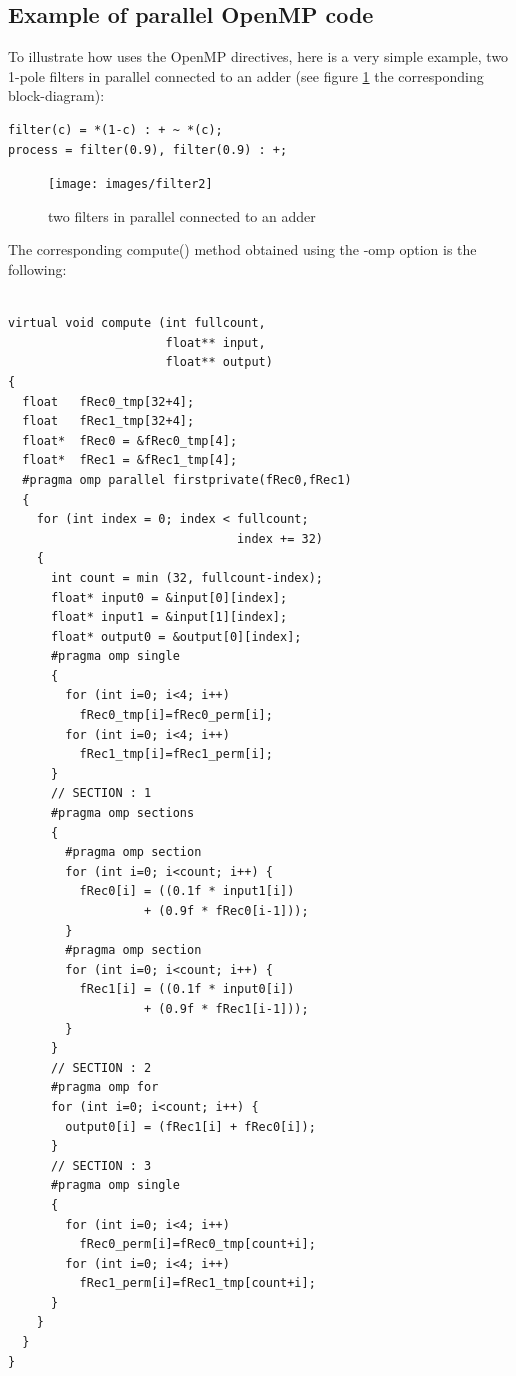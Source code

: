 \documentclass[a4paper,10pt]{book}
\begin{document}
\subsection{Example of parallel OpenMP code}
To illustrate how \faust uses the OpenMP directives, here is a very simple example, two 1-pole filters in parallel connected to an adder (see figure \ref{fig:parfilter} the corresponding block-diagram):

\begin{lstlisting}
filter(c) = *(1-c) : + ~ *(c);
process = filter(0.9), filter(0.9) : +; 
\end{lstlisting}

\begin{figure}[htb] 
  \centering
  \texttt{[image: images/filter2]}
  \caption{two filters in parallel connected to an adder}   
  \label{fig:parfilter}
\end{figure}

The corresponding compute() method obtained using the -omp option is the following:
\begin{lstlisting}

virtual void compute (int fullcount, 
                      float** input, 
                      float** output) 
{
  float   fRec0_tmp[32+4];
  float   fRec1_tmp[32+4];
  float*  fRec0 = &fRec0_tmp[4];
  float*  fRec1 = &fRec1_tmp[4];
  #pragma omp parallel firstprivate(fRec0,fRec1)
  {
    for (int index = 0; index < fullcount; 
                                index += 32) 
    {
      int count = min (32, fullcount-index);
      float* input0 = &input[0][index];
      float* input1 = &input[1][index];
      float* output0 = &output[0][index];
      #pragma omp single
      {
        for (int i=0; i<4; i++) 
          fRec0_tmp[i]=fRec0_perm[i];
        for (int i=0; i<4; i++) 
          fRec1_tmp[i]=fRec1_perm[i];
      }
      // SECTION : 1
      #pragma omp sections
      {
        #pragma omp section
        for (int i=0; i<count; i++) {
          fRec0[i] = ((0.1f * input1[i]) 
                   + (0.9f * fRec0[i-1]));
        }
        #pragma omp section
        for (int i=0; i<count; i++) {
          fRec1[i] = ((0.1f * input0[i]) 
                   + (0.9f * fRec1[i-1]));
        }
      }
      // SECTION : 2
      #pragma omp for
      for (int i=0; i<count; i++) {
        output0[i] = (fRec1[i] + fRec0[i]);
      }
      // SECTION : 3
      #pragma omp single
      {
        for (int i=0; i<4; i++) 
          fRec0_perm[i]=fRec0_tmp[count+i];
        for (int i=0; i<4; i++) 
          fRec1_perm[i]=fRec1_tmp[count+i];
      }
    }
  }
}

\end{lstlisting}
\end{document}
